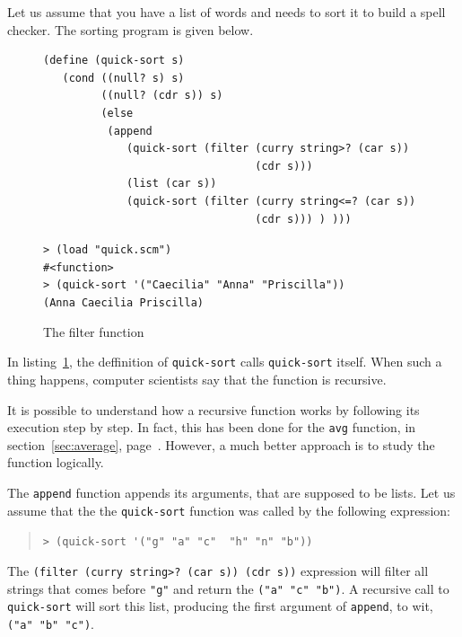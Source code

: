 \documentclass[a4paper,12pt]{book}
\newenvironment{fmpage}[1]
               {\begin{lrbox}{\fmbox}\begin{minipage}{#1}}
               {\end{minipage}\end{lrbox}\fbox{\usebox{\fmbox}}}
\begin{document}
Let us assume that you have a list
of words and needs to sort it
to build a spell checker. The sorting
program is given below.



\begin{figure}[!h]
\begin{fmpage}{\linewidth}
\begin{verbatim}
(define (quick-sort s)
   (cond ((null? s) s)
         ((null? (cdr s)) s)
         (else 
          (append 
             (quick-sort (filter (curry string>? (car s)) 
                                 (cdr s)))
             (list (car s))
             (quick-sort (filter (curry string<=? (car s))
                                 (cdr s))) ) )))
\end{verbatim}
\end{fmpage}

\begin{fmpage}{\linewidth}
  \verb|> (load "quick.scm")|\\
  \verb|#<function>|\\
  \verb|> (quick-sort '("Caecilia" "Anna" "Priscilla"))|\\
  \verb|(Anna Caecilia Priscilla)|
\end{fmpage}
\caption{The filter function}
\label{fig:filter}
\end{figure}

In listing~\ref{fig:filter}, the deffinition of
\verb|quick-sort| calls \verb|quick-sort| itself.
When such a thing happens, computer scientists
say that the function is recursive.

It is possible to understand how a recursive
function works by following its execution
step by step. In fact, this has been done
for the \verb|avg| function, in section~\ref{sec:average},
page~\pageref{sec:average}. However, a much
better approach is to study the function logically.

The \verb|append| function appends its
arguments, that are supposed to be lists.
Let us assume that the the \verb|quick-sort|
function was called by the following expression:
\begin{quote}
\verb|> (quick-sort '("g" "a" "c"  "h" "n" "b"))|
\end{quote}
The \verb|(filter (curry string>? (car s)) (cdr s))|
expression will filter all strings that comes before
\verb|"g"| and return the \verb|("a" "c" "b")|.
A recursive call to \verb|quick-sort| will
sort this list, producing the first argument
of \verb|append|, to wit, \verb|("a" "b" "c")|.
\end{document}

